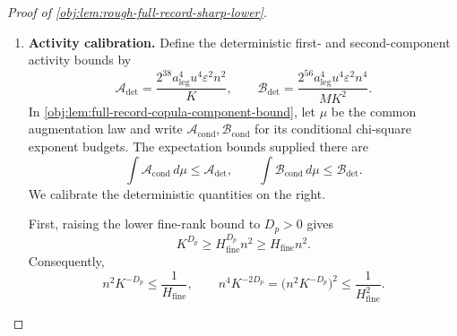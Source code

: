 \begin{proof}[Proof of \cref{obj:lem:rough-full-record-sharp-lower}]
\begin{enumerate}
The rank conditions established above allow us to apply
\cref{obj:lem:copula-frame-legality}. Every null support law belongs to \(H_0(v)\), and every alternative support law satisfies
\[
P\in\mathcal M_v,
\qquad
2^{-17}K^{-S}\le d(P)<d_0.
\]
The upper rounding bound and \(S>0\) imply
\[
\begin{aligned}
c_vn^{-E_4(p)}
&\le k_vn^{-E_4(p)}\\
&=2^{-17}(2H_{\mathrm{fine}})^{-S}n^{-2S/D_p}\\
&=2^{-17}(2H_{\mathrm{fine}}n^{2/D_p})^{-S}\\
&\le2^{-17}K^{-S}\le d(P).
\end{aligned}
\]
This proves the required alternative placement for the copula pair.

\item \textbf{Activity calibration.}
Define the deterministic first- and second-component activity bounds by
\[
\mathcal A_{\mathrm{det}}=
\frac{2^{38}a_{\mathrm{leg}}^4u^4\varepsilon^2n^2}{K},
\qquad
\mathcal B_{\mathrm{det}}=
\frac{2^{56}a_{\mathrm{leg}}^4u^4\varepsilon^2n^4}{MK^2}.
\]
In \cref{obj:lem:full-record-copula-component-bound}, let \(\mu\) be the common augmentation law and write \(\mathcal A_{\mathrm{cond}},\mathcal B_{\mathrm{cond}}\) for its conditional chi-square exponent budgets. The expectation bounds supplied there are
\[
\int\mathcal A_{\mathrm{cond}}\,d\mu
\le\mathcal A_{\mathrm{det}},
\qquad
\int\mathcal B_{\mathrm{cond}}\,d\mu
\le\mathcal B_{\mathrm{det}}.
\]
We calibrate the deterministic quantities on the right.

First, raising the lower fine-rank bound to \(D_p>0\) gives
\[
K^{D_p}\ge H_{\mathrm{fine}}^{D_p}n^2
\ge H_{\mathrm{fine}}n^2.
\]
Consequently,
\[
n^2K^{-D_p}\le\frac1{H_{\mathrm{fine}}},
\qquad
n^4K^{-2D_p}
=\bigl(n^2K^{-D_p}\bigr)^2
\le\frac1{H_{\mathrm{fine}}^2}.
\]


\end{enumerate}
\end{proof}
